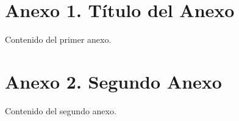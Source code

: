 \documentclass[12pt,oneside]{report}
\begin{document}
\section*{Anexo 1. Título del Anexo}
Contenido del primer anexo.

\section*{Anexo 2. Segundo Anexo}
Contenido del segundo anexo.

\end{document}
